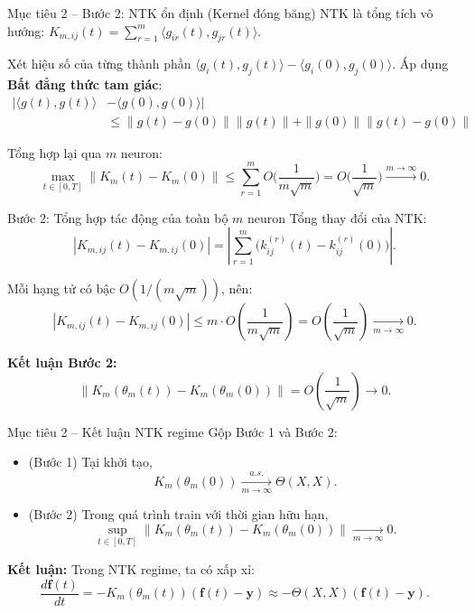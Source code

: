 \begin{frame}{Mục tiêu 2 – Bước 2: NTK ổn định (Kernel đóng băng)}
  NTK là tổng tích vô hướng: $K_{m,ij}(t) = \sum_{r=1}^m \langle g_{ir}(t), g_{jr}(t) \rangle$.

  Xét hiệu số của từng thành phần $\langle g_i(t), g_j(t) \rangle - \langle g_i(0), g_j(0) \rangle$.
  Áp dụng \textbf{Bất đẳng thức tam giác}:
  \[
    \begin{aligned}
      |\langle g(t), g(t) \rangle &- \langle g(0), g(0) \rangle| \\
      &\le \|g(t)-g(0)\|\|g(t)\| + \|g(0)\|\|g(t)-g(0)\|
    \end{aligned}
  \]
  
  Tổng hợp lại qua $m$ neuron:
  \[
    \max_{t \in [0,T]} \|K_m(t) - K_m(0)\| \le \sum_{r=1}^m O\Big(\frac{1}{m\sqrt{m}}\Big) = O\Big(\frac{1}{\sqrt{m}}\Big) \xrightarrow{m \to \infty} 0.
  \]

\end{frame}

\begin{frame}{Bước 2: Tổng hợp tác động của toàn bộ $m$ neuron}
Tổng thay đổi của NTK:
\[
  |K_{m,ij}(t) - K_{m,ij}(0)|
  = \left|\sum_{r=1}^m \big(k_{ij}^{(r)}(t) - k_{ij}^{(r)}(0)\big)\right|.
\]

Mỗi hạng tử có bậc $O(1/(m\sqrt{m}))$, nên:
\[
  |K_{m,ij}(t) - K_{m,ij}(0)|
  \le
  m \cdot O\!\left(\frac{1}{m\sqrt{m}}\right)
  = O\!\left(\frac{1}{\sqrt{m}}\right)
  \xrightarrow[m\to\infty]{}
  0.
\]

\textbf{Kết luận Bước 2:}
\[
  \|K_m(\theta_m(t)) - K_m(\theta_m(0))\|
  = O\!\left(\frac{1}{\sqrt{m}}\right)
  \to 0.
\]
\end{frame}

\begin{frame}{Mục tiêu 2 – Kết luận NTK regime}
  Gộp Bước 1 và Bước 2:
  \begin{itemize}
    \item (Bước 1) Tại khởi tạo,
      \[
        K_m(\theta_m(0)) \xrightarrow[m\to\infty]{a.s.} \Theta(X,X).
      \]
    \item (Bước 2) Trong quá trình train với thời gian hữu hạn,
      \[
        \sup_{t\in[0,T]}
        \|K_m(\theta_m(t)) - K_m(\theta_m(0))\|
        \xrightarrow[m\to\infty]{} 0.
      \]
  \end{itemize}

  \vspace{0.2cm}
  \textbf{Kết luận:} Trong NTK regime, ta có xấp xỉ:
  \[
    \frac{d\mathbf f(t)}{dt}
      = -K_m(\theta_m(t))(\mathbf f(t)-\mathbf y)
      \approx -\Theta(X,X)(\mathbf f(t)-\mathbf y).
  \]
\end{frame}

